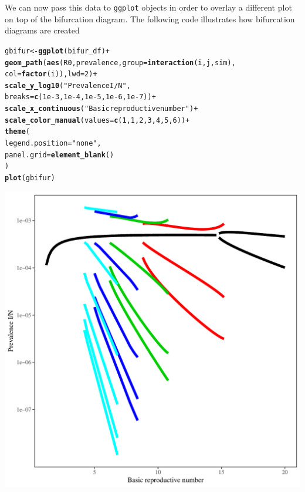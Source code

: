 \documentclass[12pt]{article}\usepackage[]{graphicx}\usepackage[]{color}
\makeatletter
\def\maxwidth{ %
  \ifdim\Gin@nat@width>\linewidth
    \linewidth
  \else
    \Gin@nat@width
  \fi
}
\newcommand{\hlnum}[1]{\textcolor[rgb]{0.686,0.059,0.569}{#1}}%
\newcommand{\hlstr}[1]{\textcolor[rgb]{0.192,0.494,0.8}{#1}}%
\newcommand{\hlopt}[1]{\textcolor[rgb]{0,0,0}{#1}}%
\newcommand{\hlstd}[1]{\textcolor[rgb]{0.345,0.345,0.345}{#1}}%
\newcommand{\hlkwb}[1]{\textcolor[rgb]{0.69,0.353,0.396}{#1}}%
\newcommand{\hlkwc}[1]{\textcolor[rgb]{0.333,0.667,0.333}{#1}}%
\newcommand{\hlkwd}[1]{\textcolor[rgb]{0.737,0.353,0.396}{\textbf{#1}}}%
\newenvironment{kframe}{%
 \def\at@end@of@kframe{}%
 \ifinner\ifhmode%
  \def\at@end@of@kframe{\end{minipage}}%
  \begin{minipage}{\columnwidth}%
 \fi\fi%
 \def\FrameCommand##1{\hskip\@totalleftmargin \hskip-\fboxsep
 \colorbox{shadecolor}{##1}\hskip-\fboxsep
     \hskip-\linewidth \hskip-\@totalleftmargin \hskip\columnwidth}%
 \MakeFramed {\advance\hsize-\width
   \@totalleftmargin\z@ \linewidth\hsize
   \@setminipage}}%
 {\par\unskip\endMakeFramed%
 \at@end@of@kframe}
\newenvironment{knitrout}{}{} %
\makeatother
\begin{document}
We can now pass this data to \texttt{ggplot} objects in order to overlay a different plot on top of the bifurcation diagram.
The following code illustrates how bifurcation diagrams are created

\begin{knitrout}
\color{fgcolor}\begin{kframe}
\begin{alltt}
\hlstd{gbifur} \hlkwb{<-} \hlkwd{ggplot}\hlstd{(bifur_df)} \hlopt{+}
    \hlkwd{geom_path}\hlstd{(}\hlkwd{aes}\hlstd{(R0, prevalence,} \hlkwc{group}\hlstd{=}\hlkwd{interaction}\hlstd{(i, j, sim),}
                  \hlkwc{col}\hlstd{=}\hlkwd{factor}\hlstd{(i)),} \hlkwc{lwd}\hlstd{=}\hlnum{2}\hlstd{)} \hlopt{+}
    \hlkwd{scale_y_log10}\hlstd{(}\hlstr{"Prevalence I/N"}\hlstd{,}
                  \hlkwc{breaks}\hlstd{=}\hlkwd{c}\hlstd{(}\hlnum{1e-3}\hlstd{,} \hlnum{1e-4}\hlstd{,} \hlnum{1e-5}\hlstd{,} \hlnum{1e-6}\hlstd{,} \hlnum{1e-7}\hlstd{))} \hlopt{+}
    \hlkwd{scale_x_continuous}\hlstd{(}\hlstr{"Basic reproductive number"}\hlstd{)} \hlopt{+}
    \hlkwd{scale_color_manual}\hlstd{(}\hlkwc{values}\hlstd{=}\hlkwd{c}\hlstd{(}\hlnum{1}\hlstd{,} \hlnum{1}\hlstd{,} \hlnum{2}\hlstd{,} \hlnum{3}\hlstd{,} \hlnum{4}\hlstd{,} \hlnum{5}\hlstd{,} \hlnum{6}\hlstd{))} \hlopt{+}
    \hlkwd{theme}\hlstd{(}
        \hlkwc{legend.position} \hlstd{=} \hlstr{"none"}\hlstd{,}
        \hlkwc{panel.grid} \hlstd{=} \hlkwd{element_blank}\hlstd{()}
    \hlstd{)}
\hlkwd{plot}\hlstd{(gbifur)}
\end{alltt}
\end{kframe}
\includegraphics[width=\maxwidth]{figure/bifur_g-1} 

\end{knitrout}
\end{document}

